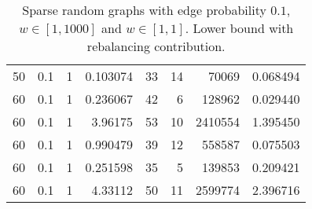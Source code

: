 \documentclass[a4paper,11pt]{article}
\begin{document}
\begin{table}
\begin{center}
\begin{tabular}{|rrr|r|r|rr|r|}
50 & 0.1 & 1 & 0.103074 & 33 & 14 & 70069 & 0.068494 \\
60 & 0.1 & 1 & 0.236067 & 42 & 6 & 128962 & 0.029440 \\
60 & 0.1 & 1 & 3.96175 & 53 & 10 & 2410554 & 1.395450 \\
60 & 0.1 & 1 & 0.990479 & 39 & 12 & 558587 & 0.075503 \\
60 & 0.1 & 1 & 0.251598 & 35 & 5 & 139853 & 0.209421 \\
60 & 0.1 & 1 & 4.33112 & 50 & 11 & 2599774 & 2.396716 \\
\hline
\end{tabular}
\end{center}
\caption{Sparse random graphs with edge probability $0.1$,
  $w\in[1,1000]$ and $w\in[1,1]$. Lower bound with rebalancing contribution.}
\label{tab:sparse-rebal}
\end{table}
\end{document}
